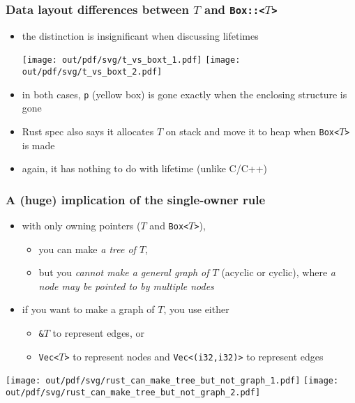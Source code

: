 \documentclass[12pt,dvipdfmx]{beamer}
\newcommand{\ao}[1]{{\color{blue}#1}}
\newcommand{\aka}[1]{{\color{red}#1}}
\begin{document}
\begin{frame}
  \frametitle{Data layout differences between $T$ and {\tt Box::<$T$>}}
  \begin{itemize}
  \item the distinction is insignificant when discussing lifetimes
    \begin{center}
      \texttt{[image: out/pdf/svg/t\_vs\_boxt\_1.pdf]}
      \hspace{1cm}
      \texttt{[image: out/pdf/svg/t\_vs\_boxt\_2.pdf]}
    \end{center}
  \item in both cases, {\tt p} (yellow box) is gone exactly when
    the enclosing structure is gone
  \item Rust spec also says it allocates $T$ on stack and
    move it to heap when {\tt Box<$T$>} is made
  \item again, it has nothing to do with lifetime (unlike C/C++)
  \end{itemize}
\end{frame}

\begin{frame}
  \frametitle{A (huge) implication of the single-owner rule}
  \begin{itemize}
  \item with only owning pointers ($T$ and {\tt Box<$T$>}), 
    \begin{itemize}
    \item you can make \ao{\it a tree of $T$}, 
    \item but you \aka{\it cannot make a general graph of $T$}
      (acyclic or cyclic),
      where {\it a node may be pointed to by multiple nodes}
    \end{itemize}
  \item if you want to make a graph of $T$, you use either 
    \begin{itemize}
    \item {\tt \&$T$} to represent edges, or
    \item {\tt Vec<$T$>} to represent nodes and {\tt Vec<(i32,i32)>}
      to represent edges
    \end{itemize}
  \end{itemize}

  \begin{center}
\texttt{[image: out/pdf/svg/rust\_can\_make\_tree\_but\_not\_graph\_1.pdf]}
\texttt{[image: out/pdf/svg/rust\_can\_make\_tree\_but\_not\_graph\_2.pdf]}
  \end{center}
\end{frame}
\end{document}

